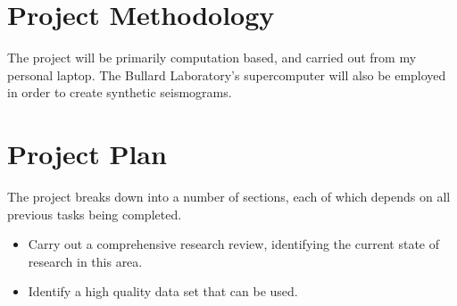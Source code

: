 \documentclass[10pt,a4paper,twocolumn]{article}
\begin{document}
\section{Project Methodology}
The project will be primarily computation based, and carried out from my personal laptop. The Bullard Laboratory's supercomputer will also be employed in order to create synthetic seismograms.
\section{Project Plan}
The project breaks down into a number of sections, each of which depends on all previous tasks being completed.

\begin{itemize}
	\item Carry out a comprehensive research review, identifying the current state of research in this area.
	\item Identify a high quality data set that can be used.
\end{itemize}
\end{document}
